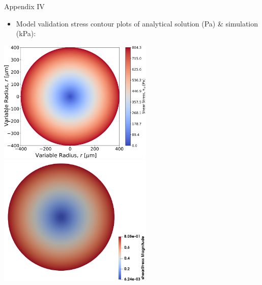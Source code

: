 \begin{frame}{Appendix IV}
\begin{itemize}
    \item Model validation stress contour plots of analytical solution (Pa) \& simulation (kPa):
\end{itemize}
\vspace{3mm}
\centering
\includegraphics[trim = 0mm 0mm 0mm 0mm, clip, width=2.9in]{./images/full_cut_contour.png}
\centering
\includegraphics[trim = 0mm 0mm 0mm 0mm, clip, width=2.9in]{./images/simulation_contour.png}
\end{frame}


